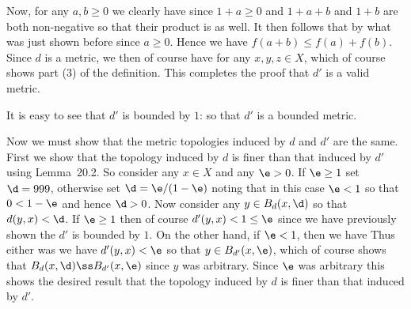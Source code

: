 {{    Now, for any $a,b \geq 0$ we clearly have
    since $1+a \geq 0$ and $1 + a + b$ and $1 + b$ are both non-negative so that their product is as well.
    It then follows that
    by what was just shown before since $a \geq 0$.
    Hence we have $f(a+b) \leq f(a) + f(b)$.
    Since $d$ is a metric, we then of course have
    for any $x,y,z \in X$, which of course shows part (3) of the definition.
    This completes the proof that $d'$ is a valid metric.

    It is easy to see that $d'$ is bounded by $1$:
    so that $d'$ is a bounded metric.
    
    Now we must show that the metric topologies induced by $d$ and $d'$ are the same.
    First we show that the topology induced by $d$ is finer than that induced by $d'$ using Lemma~20.2.
    So consider any $x \in X$ and any $\e > 0$.
    If $\e \geq 1$ set $\d = 999$, otherwise set $\d = \e/(1-\e)$ noting that in this case $\e < 1$ so that $0 < 1-\e$ and hence $\d > 0$.
    Now consider any $y \in B_d(x, \d)$ so that $d(y,x) < \d$.
    If $\e \geq 1$ then of course $d'(y,x) < 1 \leq \e$ since we have previously shown the $d'$ is bounded by $1$.
    On the other hand, if $\e < 1$, then we have
    Thus either was we have $d'(y,x) < \e$ so that $y \in B_{d'}(x, \e)$, which of course shows that $B_d(x,\d) \ss B_{d'}(x,\e)$ since $y$ was arbitrary.
    Since $\e$ was arbitrary this shows the desired result that the topology induced by $d$ is finer than that induced by $d'$.

}}
